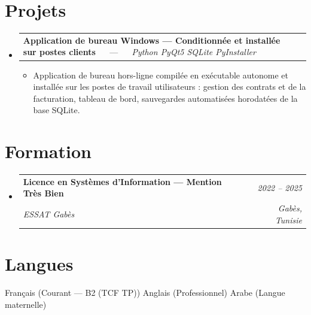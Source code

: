 \documentclass[letterpaper,9pt]{article}
\makeatletter
\newcommand{\resumeItem}[1]{\item\small{#1}}
\newcommand{\resumeSubheading}[4]{
  \vspace{-1pt}\item
  \begin{tabular*}{0.97\textwidth}[t]{l@{\extracolsep{\fill}}r}
    \textbf{#1} & \textit{\color{greytext}#2} \\
    \textit{\small\color{greytext} #3} & \textit{\small\color{greytext} #4}
  \end{tabular*}\vspace{-2pt}
}
\newcommand{\resumeProjectHeading}[2]{
  \item
  \begin{tabular*}{0.97\textwidth}{l@{\extracolsep{\fill}}r}
    \small #1 & #2
  \end{tabular*}\vspace{-1pt}
}
\newcommand{\resumeSubHeadingListStart}{\begin{itemize}[leftmargin=0.18in, label={}, itemsep=1.2pt, topsep=2.5pt, parsep=0pt]}
\newcommand{\resumeSubHeadingListEnd}{\end{itemize}\vspace{-2pt}}
\newcommand{\resumeProjectListStart}{\begin{itemize}[leftmargin=0.24in, label={}, itemsep=0.9pt, topsep=1.2pt, parsep=0pt]}
\newcommand{\resumeProjectListEnd}{\end{itemize}\vspace{-2pt}}
\makeatother
\begin{document}
\section{Projets}
\resumeSubHeadingListStart

  \resumeProjectHeading{\textbf{Application de bureau Windows --- Conditionnée et installée sur postes clients} $\quad$ --- $\quad$ \emph{\color{greytext}Python \textperiodcentered{} PyQt5 \textperiodcentered{} SQLite \textperiodcentered{} PyInstaller}}{}
    \resumeProjectListStart
      \resumeItem{Application de bureau hors-ligne compilée en exécutable autonome et installée sur les postes de travail utilisateurs : gestion des contrats et de la facturation, tableau de bord, sauvegardes automatisées horodatées de la base SQLite.}
    \resumeProjectListEnd

\resumeSubHeadingListEnd\vspace{-3pt}

\section{Formation}
\resumeSubHeadingListStart
  \resumeSubheading{Licence en Systèmes d'Information --- Mention Très Bien}{2022 -- 2025}{ESSAT Gabès}{Gabès, Tunisie}
\resumeSubHeadingListEnd\vspace{-1pt}

\section{Langues}
\begin{itemize}[leftmargin=0.18in, label={}, topsep=2pt, itemsep=1pt, parsep=0pt]
\footnotesize{
  \item Français (Courant --- B2 (TCF TP)) \textperiodcentered{} Anglais (Professionnel) \textperiodcentered{} Arabe (Langue maternelle)
}
\end{itemize}
\end{document}
